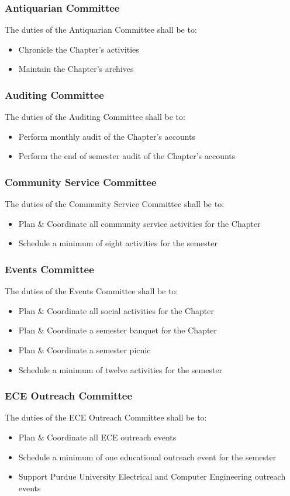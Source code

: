 \documentclass[10pt, oneside]{article}
\begin{document}
\subsubsection{Antiquarian Committee}
The duties of the Antiquarian Committee shall be to:
\begin{itemize}
\item Chronicle the Chapter’s activities
\item Maintain the Chapter’s archives
\end{itemize}
\subsubsection{Auditing Committee}
The duties of the Auditing Committee shall be to:
\begin{itemize}
\item Perform monthly audit of the Chapter’s accounts
\item Perform the end of semester audit of the Chapter’s accounts
\end{itemize}
\subsubsection{Community Service Committee}
The duties of the Community Service Committee shall be to:
\begin{itemize}
\item Plan \& Coordinate all community service activities for the Chapter
\item Schedule a minimum of eight activities for the semester
\end{itemize}
\subsubsection{Events Committee}
The duties of the Events Committee shall be to:
\begin{itemize}
\item Plan \& Coordinate all social activities for the Chapter
\item Plan \& Coordinate a semester banquet for the Chapter
\item Plan \& Coordinate a semester picnic
\item Schedule a minimum of twelve activities for the semester
\end{itemize}
\subsubsection{ECE Outreach Committee}
The duties of the ECE Outreach Committee shall be to:
\begin{itemize}
\item Plan \& Coordinate all ECE outreach events
\item Schedule a minimum of one educational outreach event for the semester
\item Support Purdue University Electrical and Computer Engineering outreach events
\end{itemize}
\end{document}
